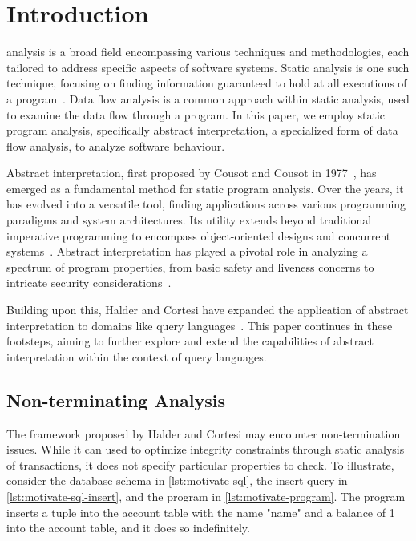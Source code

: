 \section{Introduction}\label{sec:introduction}
 analysis is a broad field encompassing various techniques and methodologies, each tailored to address specific aspects of software systems.
Static analysis is one such technique, focusing on finding information guaranteed to hold at all executions of a program~\cite{jackson_software_2000}.
Data flow analysis is a common approach within static analysis, used to examine the data flow through a program.
In this paper, we employ static program analysis, specifically abstract interpretation, a specialized form of data flow analysis, to analyze software behaviour.


Abstract interpretation, first proposed by Cousot and Cousot in 1977~\cite{cousot_abstract_1977}, has emerged as a fundamental method for static program analysis.
Over the years, it has evolved into a versatile tool, finding applications across various programming paradigms and system architectures.
Its utility extends beyond traditional imperative programming to encompass object-oriented designs and concurrent systems~\cite{gustafsson_analyzing_2013, mine_static_2023}.
Abstract interpretation has played a pivotal role in analyzing a spectrum of program properties, from basic safety and liveness concerns to intricate security considerations~\cite{mastroeni_abstract_2011}.

Building upon this, Halder and Cortesi have expanded the application of abstract interpretation to domains like query languages~\cite{halder_abstract_2012}.
This paper continues in these footsteps, aiming to further explore and extend the capabilities of abstract interpretation within the context of query languages.


\subsection{Non-terminating Analysis}\label{subsec:non-terminating-analysis}
The framework proposed by Halder and Cortesi may encounter non-termination issues.
While it can used to optimize integrity constraints through static analysis of transactions, it does not specify particular properties to check.
To illustrate, consider the database schema in \autoref{lst:motivate-sql}, the insert query in \autoref{lst:motivate-sql-insert}, and the program in \autoref{lst:motivate-program}.
The program inserts a tuple into the account table with the name "name" and a balance of 1 into the account table, and it does so indefinitely.


